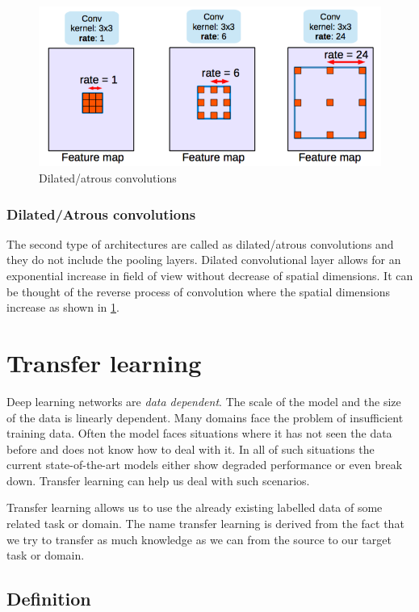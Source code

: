 \documentclass[a4paper, 12pt, oneside, BCOR1cm,toc=chapterentrywithdots]{scrbook}
\begin{document}
\begin{figure}[h]
\centering
\includegraphics[width=1\textwidth]{dilated_conv.png}
\caption{Dilated/atrous convolutions \cite{yu2015multi}}
\label{dilated}
\end{figure}


\subsubsection{Dilated/Atrous convolutions}
The second type of architectures are called as dilated/atrous convolutions and they do not include the pooling layers. Dilated convolutional layer allows for an exponential increase in field of view without decrease of spatial dimensions. It can be thought of the reverse process of convolution where the spatial dimensions increase as shown in \ref{dilated}. 


\section{Transfer learning}

Deep learning networks are \textit{data dependent}. The scale of the model and the size of the data is linearly dependent. Many domains face the problem of insufficient training data. Often the model faces situations where it has not seen the data before and does not know how to deal with it. In all of such situations the current state-of-the-art models either show degraded performance or even break down. Transfer learning can help us deal with such scenarios.

Transfer learning allows us to use the already existing labelled data of some related task or domain. The name transfer learning is derived from the fact that we try to transfer as much knowledge as we can from the source to our target task or domain. 

\subsection{Definition}
\end{document}
